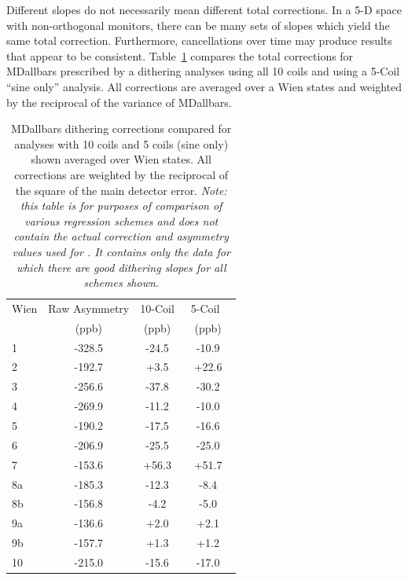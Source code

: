 Different slopes do not necessarily mean different total corrections. In a 5-D space with non-orthogonal monitors, there can be many sets of slopes which yield the same total correction. Furthermore, cancellations over time may produce results that appear to be consistent. Table~\ref{tab:dithering_corrections_table} compares the total corrections for MDallbars prescribed by a dithering analyses using all 10 coils and using a 5-Coil ``sine only'' analysis. All corrections are averaged over a Wien states and weighted by the reciprocal of the variance of MDallbars.
\begin{table}[!h]
\caption{MDallbars dithering corrections compared for analyses with 10 coils and 5 coils (sine only) shown averaged over Wien states. All corrections are weighted by the reciprocal of the square of the main detector error. {\it Note: this table is for purposes of comparison of various regression schemes and does not contain the actual correction and asymmetry values used for \Q. It contains only the data for which there are good dithering slopes for all schemes shown.}}
\begin{center}
\begin{tabular}[h]{|l|c|c|c|}\hline
Wien & Raw Asymmetry & 10-Coil &~5-Coil~~\\
~ & (ppb) & (ppb) & (ppb)\\\hline
  1  & -328.5 & -24.5 & -10.9 \\\hline
  2  & -192.7 & +3.5 & +22.6 \\\hline
  3  & -256.6 & -37.8 & -30.2 \\\hline
  4  & -269.9 & -11.2 & -10.0 \\\hline
  5  & -190.2 & -17.5 & -16.6 \\\hline
  6  & -206.9 & -25.5 & -25.0 \\\hline
  7  & -153.6 & +56.3 & +51.7 \\\hline
  8a & -185.3 & -12.3 & -8.4 \\\hline
  8b & -156.8 & -4.2 & -5.0 \\\hline
  9a & -136.6 & +2.0 & +2.1 \\\hline
  9b & -157.7 & +1.3 & +1.2 \\\hline
  10 & -215.0 & -15.6 & -17.0 \\\hline
\end{tabular}
\end{center}
\label{tab:dithering_corrections_table}
\end{table}

